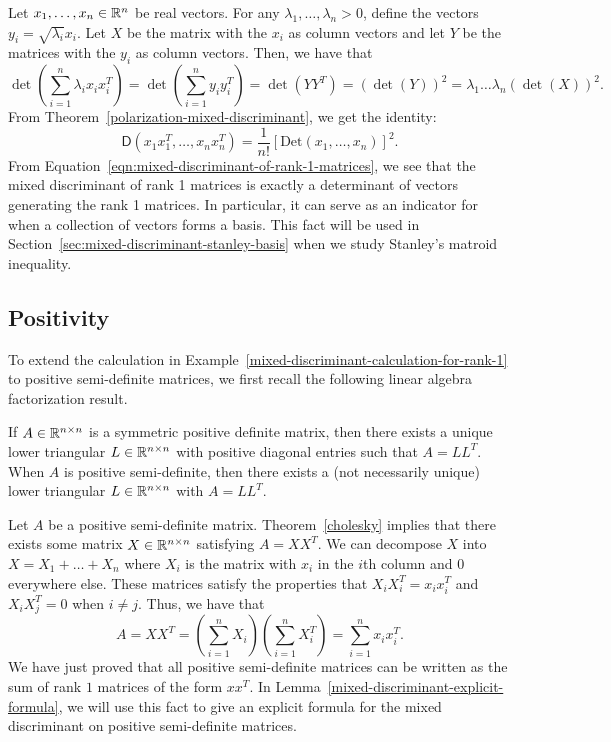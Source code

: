 \documentclass{puthesis-UG}
\begin{document}
\begin{example} \label{mixed-discriminant-calculation-for-rank-1}
	Let $x_1, \ldots, x_n \in \mathbb{R}^n$ be real vectors. For any $\lambda_1, \ldots, \lambda_n > 0$, define the vectors $y_i = \sqrt{\lambda_i} x_i$. Let $X$ be the matrix with the $x_i$ as column vectors and let $Y$ be the matrices with the $y_i$ as column vectors. Then, we have that 
	\[
		\det \left ( \sum_{i = 1}^n \lambda_i x_i x_i^T \right ) = \det \left ( \sum_{i = 1}^n y_i y_i^T \right ) = \det (YY^T) = (\det (Y))^2 = \lambda_1 \ldots \lambda_n (\det (X))^2.
	\]
	From Theorem~\ref{polarization-mixed-discriminant}, we get the identity:
	\begin{equation} \label{eqn:mixed-discriminant-of-rank-1-matrices}
		\mathsf{D} (x_1x_1^T, \ldots, x_nx_n^T) = \frac{1}{n!} \left [ \text{Det} (x_1, \ldots, x_n) \right ]^2.
	\end{equation}
	From Equation~\ref{eqn:mixed-discriminant-of-rank-1-matrices}, we see that the mixed discriminant of rank 1 matrices is exactly a determinant of vectors generating the rank 1 matrices. In particular, it can serve as an indicator for when a collection of vectors forms a basis. This fact will be used in Section~\ref{sec:mixed-discriminant-stanley-basis} when we study Stanley's matroid inequality. 
\end{example}



\subsection{Positivity}

To extend the calculation in Example~\ref{mixed-discriminant-calculation-for-rank-1} to positive semi-definite matrices, we first recall the following linear algebra factorization result. 

\begin{thm}  \label{cholesky}
	If $A \in \mathbb{R}^{n \times n}$ is a symmetric positive definite matrix, then there exists a unique lower triangular $L \in \mathbb{R}^{n \times n}$ with positive diagonal entries such that $A = LL^T$. When $A$ is positive semi-definite, then there exists a (not necessarily unique) lower triangular $L \in \mathbb{R}^{n \times n}$ with $A = LL^T$. 
\end{thm}

Let $A$ be a positive semi-definite matrix. Theorem~\ref{cholesky} implies that there exists some matrix $X \in \mathbb{R}^{n \times n}$ satisfying $A = X X^T$. We can decompose $X$ into $X = X_1 + \ldots + X_n$ where $X_i$ is the matrix with $x_i$ in the $i$th column and $0$ everywhere else. These matrices satisfy the properties that $X_i X_i^T = x_ix_i^T$ and $X_i X_j^T = 0$ when $i \neq j$. Thus, we have that 
\[
	A = X X^T = \left ( \sum_{i = 1}^n X_i \right ) \left ( \sum_{i = 1}^n X_i^T \right ) = \sum_{i = 1}^n x_ix_i^T.
\]
We have just proved that all positive semi-definite matrices can be written as the sum of rank $1$ matrices of the form $xx^T$. In Lemma~\ref{mixed-discriminant-explicit-formula}, we will use this fact to give an explicit formula for the mixed discriminant on positive semi-definite matrices. 
\end{document}
